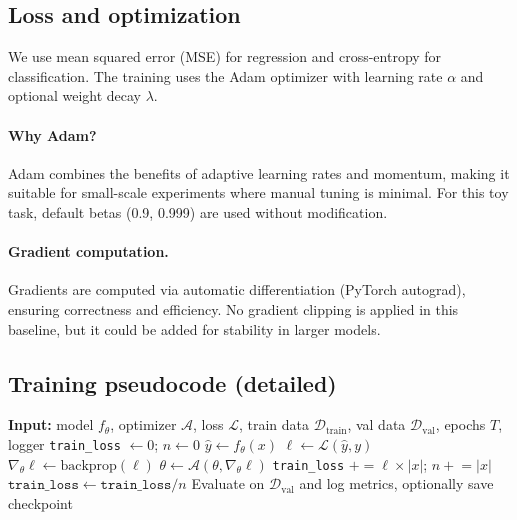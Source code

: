 \documentclass[11pt]{article}
\begin{document}
\subsection{Loss and optimization}
We use mean squared error (MSE) for regression and cross-entropy for classification. The training uses the Adam optimizer with learning rate $\alpha$ and optional weight decay $\lambda$.

\paragraph{Why Adam?} Adam combines the benefits of adaptive learning rates and momentum, making it suitable for small-scale experiments where manual tuning is minimal. For this toy task, default betas (0.9, 0.999) are used without modification.

\paragraph{Gradient computation.} Gradients are computed via automatic differentiation (PyTorch autograd), ensuring correctness and efficiency. No gradient clipping is applied in this baseline, but it could be added for stability in larger models.

\subsection{Training pseudocode (detailed)}
\begin{algorithm}[H]
\caption{Detailed training loop with logging}
\begin{algorithmic}[1]
\State \textbf{Input:} model $f_{\theta}$, optimizer $\mathcal{A}$, loss $\mathcal{L}$, train data $\mathcal{D}_{\mathrm{train}}$, val data $\mathcal{D}_{\mathrm{val}}$, epochs $T$, logger
  \State \texttt{train\_loss} $\leftarrow 0$; $n\leftarrow 0$
    \State $\hat{y} \leftarrow f_{\theta}(x)$
    \State $\ell \leftarrow \mathcal{L}(\hat{y},y)$
    \State $\nabla_{\theta} \ell \leftarrow \text{backprop}(\ell)$
    \State $\theta \leftarrow \mathcal{A}(\theta,\nabla_{\theta} \ell)$
    \State \texttt{train\_loss} $\mathrel{+}= \ell \times |x|$; $n\mathrel{+}=|x|$
  \EndFor
  \State $\texttt{train\_loss} \leftarrow \texttt{train\_loss} / n$
  \State Evaluate on $\mathcal{D}_{\mathrm{val}}$ and log metrics, optionally save checkpoint
\EndFor
\end{algorithmic}
\end{algorithm}
\end{document}
